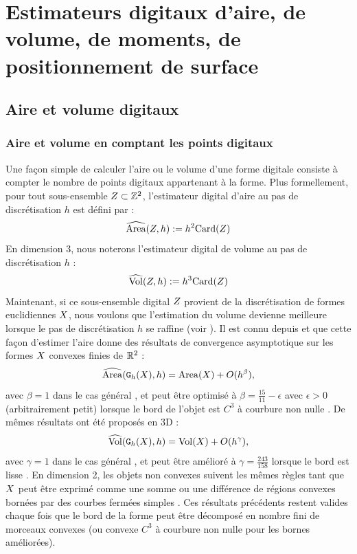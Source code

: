 \section{Estimateurs digitaux d'aire, de volume, de moments, de positionnement de surface}
%
\subsection{Aire et volume digitaux}
%
\subsubsection{Aire et volume en comptant les points digitaux}
\label{sec:AreaByCounting}
%
Une façon simple de calculer l'aire ou le volume d'une forme digitale consiste à
compter le nombre de points digitaux appartenant à la forme. Plus formellement,
pour tout sous-ensemble $Z \subset \mathbb{Z}^2$, l'estimateur digital d'aire au pas
de discrétisation $h$ est défini par :
%
\begin{equation}
  \widehat{\mathrm{Area}}(Z, h) := h^2 \mathrm{Card}(Z)
\end{equation}
%
En dimension $3$, nous noterons l'estimateur digital de volume au pas de
discrétisation $h$ :
%
\begin{equation}
  \widehat{\mathrm{Vol}}(Z, h) := h^3 \mathrm{Card}(Z)
\end{equation}
%
Maintenant, si ce sous-ensemble digital $Z$ provient de la discrétisation de
formes euclidiennes $X$, nous voulons que l'estimation du volume devienne
meilleure lorsque le pas de discrétisation $h$ se raffine (voir
). Il est connu depuis
 et  que cette façon d'estimer l'aire donne
des résultats de convergence asymptotique sur les formes $X$ convexes
finies de $\mathbb{R}^2$ :
%
\begin{equation}
  \label{eq:AreaByCountingConv}
  \widehat{\mathrm{Area}}(\mathtt{G}_{h}(X),h) = \mathrm{Area}(X) + O(h^\beta),
\end{equation}
%
avec $\beta = 1$ dans le cas général \cite{Klette2000}, et peut être optimisé à
$\beta = \frac{15}{11} - \epsilon$ avec $\epsilon > 0$ (arbitrairement petit)
lorsque le bord de l'objet est $C^3$ à courbure non nulle \cite{Huxley1990}.
De mêmes résultats ont été proposés en 3D :
%
\begin{equation}
  \label{eq:VolumeByCountingConv}
  \widehat{\mathrm{Vol}}(\mathtt{G}_{h}(X),h) = \mathrm{Vol}(X) + O(h^\gamma),
\end{equation}
%
avec $\gamma = 1$ dans le cas général \cite{Kratzel1988}, et peut être amélioré à
$\gamma=\frac{243}{158}$ lorsque le bord est lisse \cite{Guo2010}.
%
En dimension 2, les objets non convexes suivent les mêmes règles tant que
$X$ peut être exprimé comme une somme ou une différence de régions convexes
bornées par des courbes fermées simples \cite{Huxley1996}. Ces résultats
précédents restent valides chaque fois que le bord de la forme peut être
décomposé en nombre fini de morceaux convexes (ou convexe $C^3$ à courbure non
nulle pour les bornes améliorées).
%
